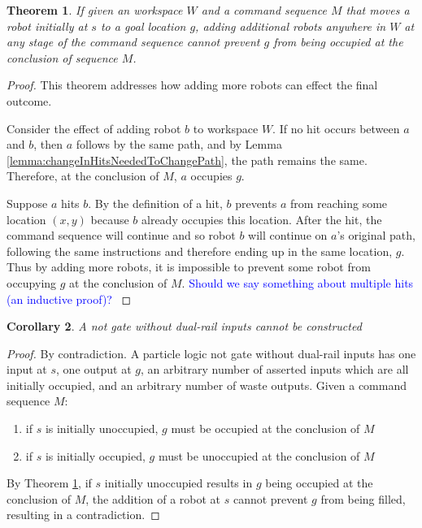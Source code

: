 \documentclass[letterpaper, 10 pt, conference]{ieeeconf}
\newtheorem{theorem}{Theorem}
\newtheorem{corollary}[theorem]{Corollary}
\begin{document}
\begin{theorem}\label{thm:AdditionalRobotsCannotPreventAnOccupation}
If given an workspace $W$ and a command sequence $M$ that moves a robot initially at $s$ to a goal location $g$, adding additional robots anywhere in $W$ at any stage of the command sequence cannot prevent $g$ from being occupied at the conclusion of sequence $M$.
\end{theorem}

\begin{proof} 
This theorem addresses how adding more robots can effect the final outcome. 

Consider the effect of adding robot $b$ to workspace $W$. If no hit occurs between $a$ and $b$, then $a$ follows by the same path, and by Lemma \ref{lemma:changeInHitsNeededToChangePath}, the path remains the same. Therefore, at the conclusion of $M$, $a$ occupies $g$. 

Suppose $a$ hits $b$. By the definition of a hit, $b$ prevents $a$ from reaching some location $(x,y)$ because $b$ already occupies this location. After the hit, the command sequence will continue and so robot $b$ will continue on $a$'s original path, following the same instructions and therefore ending up in the same location, $g$. Thus by adding more robots, it is impossible to prevent some robot from occupying $g$ at the conclusion of $M$.  \textcolor{blue}{Should we say something about multiple hits (an inductive proof)? }
\end{proof}

\begin{corollary}
A  {\sc not} gate without dual-rail inputs cannot be constructed
\end{corollary}
\begin{proof}
By contradiction.
A particle logic {\sc not} gate without dual-rail inputs has one input at $s$, one output at $g$, an arbitrary number of asserted inputs which are all initially occupied, and an arbitrary number of waste outputs.
Given a command sequence $M$:  
\begin{enumerate}
\item if $s$ is initially unoccupied, $g$ must be occupied at the conclusion of $M$
\item if $s$ is initially occupied, $g$ must be unoccupied at the conclusion of $M$ 
\end{enumerate}
By Theorem \ref{thm:AdditionalRobotsCannotPreventAnOccupation}, if $s$ initially unoccupied results in $g$ being occupied at the conclusion of $M$, the addition of a robot at $s$ cannot prevent $g$ from being filled, resulting in a contradiction.
\end{proof}
\end{document}
